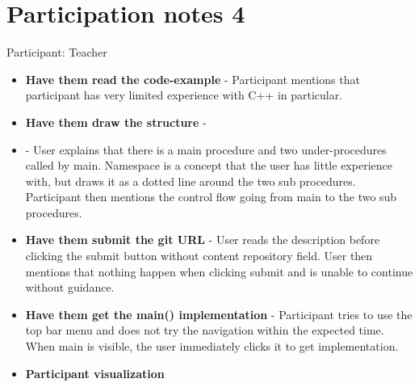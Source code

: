 \section{Participation notes 4}
Participant: Teacher

\begin{itemize}
    \item \textbf{Have them read the code-example} - Participant mentions that participant has very limited experience with C++ in particular. 
    \item \textbf{Have them draw the structure} - 
    \item \textbf{} - User explains that there is a main procedure and two under-procedures called by main. Namespace is a concept that the user has little experience with, but draws it as a dotted line around the two sub procedures. Participant then mentions the control flow going from main to the two sub procedures. 
    \item \textbf{Have them submit the git URL} - User reads the description before clicking the submit button without content repository field. User then mentions that nothing happen when clicking submit and is unable to continue without guidance.
    \item \textbf{Have them get the main() implementation} - Participant tries to use the top bar menu and does not try the navigation within the expected time. When main is visible, the user immediately clicks it to get implementation.
    \item \textbf{Participant visualization} 
\end{itemize}